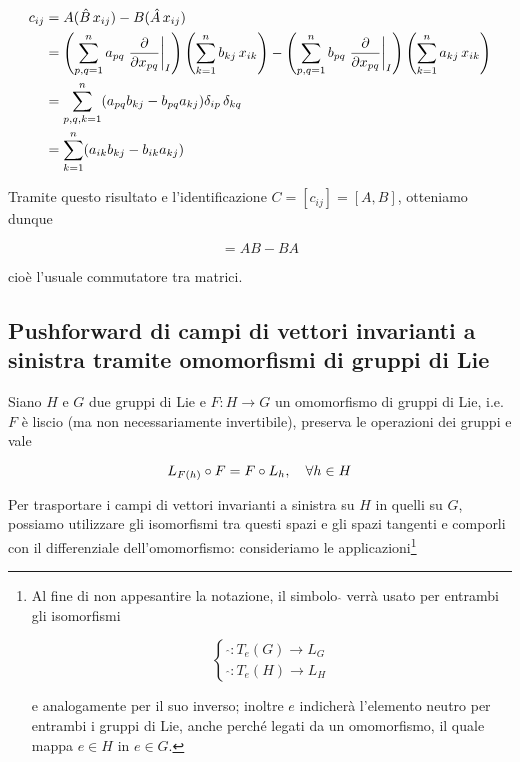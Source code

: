 \begin{align}
	\begin{split}
		c_{ij} &= A (\hat{B} \, x_{ij}) - B (\hat{A} \, x_{ij})\\
		&= \left( \sum_{p,q=1}^{n} a_{pq} \eval{ \pdv{x_{pq}} }_{I} \right) \left( \displaystyle\sum_{k=1}^{n} b_{kj} \, x_{ik} \right) - \left( \sum_{p,q=1}^{n} b_{pq} \eval{ \pdv{x_{pq}} }_{I} \right) \left( \displaystyle\sum_{k=1}^{n} a_{kj} \, x_{ik} \right)\\
		&= \sum_{p,q,k=1}^{n} ( a_{pq} b_{kj} - b_{pq} a_{kj} ) \delta_{ip} \, \delta_{kq}\\
		&= \sum_{k=1}^{n} ( a_{ik} b_{kj} - b_{ik} a_{kj} )
	\end{split}
\end{align}

Tramite questo risultato e l'identificazione $ C = [c_{ij}] = [A,B] $, otteniamo dunque

\begin{equation}
	[A,B] = A B - B A
\end{equation}

cioè l'usuale commutatore tra matrici.

\subsection{Pushforward di campi di vettori invarianti a sinistra tramite omomorfismi di gruppi di Lie}

Siano $ H $ e $ G $ due gruppi di Lie e $ F : H \to G $ un omomorfismo di gruppi di Lie, i.e. $ F $ è liscio (ma non necessariamente invertibile), preserva le operazioni dei gruppi e vale

\begin{equation}
	L_{F(h)} \circ F = F \circ L_{h} \qcomma \forall h \in H
\end{equation}

Per trasportare i campi di vettori invarianti a sinistra su $ H $ in quelli su $ G $, possiamo utilizzare gli isomorfismi tra questi spazi e gli spazi tangenti e comporli con il differenziale dell'omomorfismo: consideriamo le applicazioni\footnote{%
	Al fine di non appesantire la notazione, il simbolo $ \hat{} $ verrà usato per entrambi gli isomorfismi
	
	\begin{equation*}
		\begin{cases}
			\hat{} : T_{e}(G) \to L_{G}\\
			\hat{} : T_{e}(H) \to L_{H}
		\end{cases}
	\end{equation*}
	
	e analogamente per il suo inverso; inoltre $ e $ indicherà l'elemento neutro per entrambi i gruppi di Lie, anche perché legati da un omomorfismo, il quale mappa $ e \in H $ in $ e \in G $.%
}

